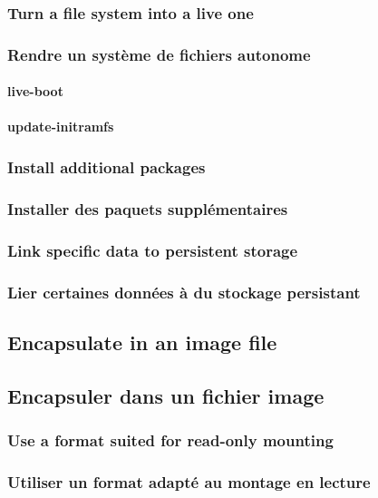 \ml
{\subsubsection{Turn a file system into a live one}}
{\subsubsection{Rendre un système de fichiers autonome}}

\paragraph{live-boot}

\paragraph{update-initramfs}

\ml
{\subsubsection{Install additional packages}}
{\subsubsection{Installer des paquets supplémentaires}}

\ml
{\subsubsection{Link specific data to persistent storage}}
{\subsubsection{Lier certaines données à du stockage persistant}}

\ml
{\subsection{Encapsulate in an image file}}
{\subsection{Encapsuler dans un fichier image}}

\ml
{\subsubsection{Use a format suited for read-only mounting}}
{\subsubsection{Utiliser un format adapté au montage en lecture}}

